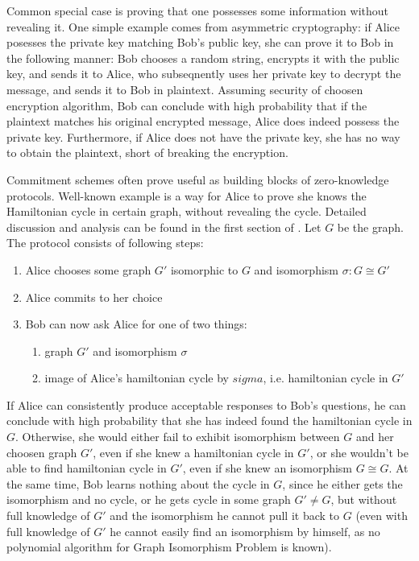 \documentclass[10pt]{article}
\begin{document}
Common special case is proving that one possesses some information without revealing it.
One simple example comes from asymmetric cryptography: if Alice posesses the private key matching Bob's
public key, she can prove it to Bob in the following manner: Bob chooses a random string, encrypts it
with the public key, and sends it to Alice, who subseqnently uses her private key to decrypt the message,
and sends it to Bob in plaintext. Assuming security of choosen encryption algorithm, Bob can conclude 
with high probability that if the plaintext matches his original encrypted message, Alice does indeed
possess the private key. Furthermore, if Alice does not have the private key, she has no way to obtain
the plaintext, short of breaking the encryption.

Commitment schemes often prove useful as building blocks of zero-knowledge protocols. Well-known example
is a way for Alice to prove she knows the Hamiltonian cycle in certain graph, without revealing the
cycle. Detailed discussion and analysis can be found in the first section of \cite{CM:CryptoNotes}. 
Let \(G\) be the graph. The protocol consists of following steps:

\begin{enumerate}
  \item Alice chooses some graph \(G'\) isomorphic to \(G\) and isomorphism \(\sigma\colon G\cong G'\)
  \item Alice commits to her choice
  \item Bob can now ask Alice for one of two things:
    \begin{enumerate}
      \item graph \(G'\) and isomorphism \(\sigma\)
      \item image of Alice's hamiltonian cycle by \(sigma\), i.e. hamiltonian cycle in \(G'\)
    \end{enumerate}
\end{enumerate}

If Alice can consistently produce acceptable responses to Bob's questions, he can conclude with high
probability that she has indeed found the hamiltonian cycle in \(G\). Otherwise, she would either fail
to exhibit isomorphism between \(G\) and her choosen graph \(G'\), even if she knew a hamiltonian
cycle in \(G'\), or she wouldn't be able to find hamiltonian cycle in \(G'\), even if she knew an
isomorphism \(G\cong G\). At the same time, Bob learns nothing about the cycle in \(G\), since he
either gets the isomorphism and no cycle, or he gets cycle in some graph \(G'\neq G\), but without
full knowledge of \(G'\) and the isomorphism he cannot pull it back to \(G\) (even with full knowledge
of \(G'\) he cannot easily find an isomorphism by himself, as no polynomial algorithm for Graph 
Isomorphism Problem is known).
\end{document}

